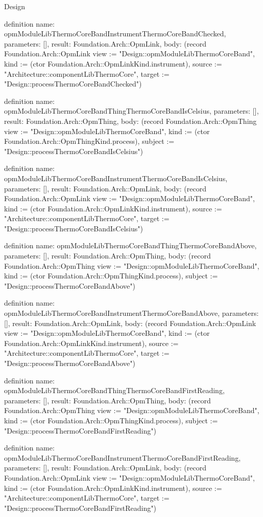 \begin{lexlean}{Design}
\begin{semanticmodule}
definition{
  name: opmModuleLibThermoCoreBandInstrumentThermoCoreBandChecked,
  parameters: [],
  result: Foundation.Arch::OpmLink,
  body: (record Foundation.Arch::OpmLink {view := "Design::opmModuleLibThermoCoreBand", kind := (ctor Foundation.Arch::OpmLinkKind.instrument), source := "Architecture::componentLibThermoCore", target := "Design::processThermoCoreBandChecked"})
}

definition{
  name: opmModuleLibThermoCoreBandThingThermoCoreBandIsCelsius,
  parameters: [],
  result: Foundation.Arch::OpmThing,
  body: (record Foundation.Arch::OpmThing {view := "Design::opmModuleLibThermoCoreBand", kind := (ctor Foundation.Arch::OpmThingKind.process), subject := "Design::processThermoCoreBandIsCelsius"})
}

definition{
  name: opmModuleLibThermoCoreBandInstrumentThermoCoreBandIsCelsius,
  parameters: [],
  result: Foundation.Arch::OpmLink,
  body: (record Foundation.Arch::OpmLink {view := "Design::opmModuleLibThermoCoreBand", kind := (ctor Foundation.Arch::OpmLinkKind.instrument), source := "Architecture::componentLibThermoCore", target := "Design::processThermoCoreBandIsCelsius"})
}

definition{
  name: opmModuleLibThermoCoreBandThingThermoCoreBandAbove,
  parameters: [],
  result: Foundation.Arch::OpmThing,
  body: (record Foundation.Arch::OpmThing {view := "Design::opmModuleLibThermoCoreBand", kind := (ctor Foundation.Arch::OpmThingKind.process), subject := "Design::processThermoCoreBandAbove"})
}

definition{
  name: opmModuleLibThermoCoreBandInstrumentThermoCoreBandAbove,
  parameters: [],
  result: Foundation.Arch::OpmLink,
  body: (record Foundation.Arch::OpmLink {view := "Design::opmModuleLibThermoCoreBand", kind := (ctor Foundation.Arch::OpmLinkKind.instrument), source := "Architecture::componentLibThermoCore", target := "Design::processThermoCoreBandAbove"})
}

definition{
  name: opmModuleLibThermoCoreBandThingThermoCoreBandFirstReading,
  parameters: [],
  result: Foundation.Arch::OpmThing,
  body: (record Foundation.Arch::OpmThing {view := "Design::opmModuleLibThermoCoreBand", kind := (ctor Foundation.Arch::OpmThingKind.process), subject := "Design::processThermoCoreBandFirstReading"})
}

definition{
  name: opmModuleLibThermoCoreBandInstrumentThermoCoreBandFirstReading,
  parameters: [],
  result: Foundation.Arch::OpmLink,
  body: (record Foundation.Arch::OpmLink {view := "Design::opmModuleLibThermoCoreBand", kind := (ctor Foundation.Arch::OpmLinkKind.instrument), source := "Architecture::componentLibThermoCore", target := "Design::processThermoCoreBandFirstReading"})
}


\end{semanticmodule}
\end{lexlean}

